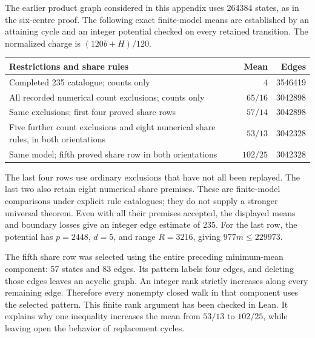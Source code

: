 \documentclass[11pt,a4paper]{article}
\theoremstyle{definition}
\theoremstyle{remark}
\begin{document}
The earlier product graph considered in this appendix uses 264384 states, as in the six-centre proof. The following exact finite-model means are established by an attaining cycle and an integer potential checked on every retained transition. The normalized charge is $(120b+H)/120$.
\begin{center}
\begin{tabular}{p{}rr}
\toprule
Restrictions and share rules & Mean & Edges\\\midrule
Completed 235 catalogue; counts only & $4$ & 3546419\\
All recorded numerical count exclusions; counts only & $65/16$ & 3042898\\
Same exclusions; first four proved share rows & $57/14$ & 3042898\\
Five further count exclusions and eight numerical share rules, in both orientations & $53/13$ & 3042328\\
Same model; fifth proved share row in both orientations & $102/25$ & 3042328\\
\bottomrule
\end{tabular}
\end{center}
The last four rows use ordinary exclusions that have not all been replayed. The last two also retain eight numerical share premises. These are finite-model comparisons under explicit rule catalogues; they do not supply a stronger universal theorem. Even with all their premises accepted, the displayed means and boundary losses give an integer edge estimate of 235. For the last row, the potential has $p=2448$, $d=5$, and range $R=3216$, giving $977m\le229973$.

The fifth share row was selected using the entire preceding minimum-mean component: 57 states and 83 edges. Its pattern labels four edges, and deleting those edges leaves an acyclic graph. An integer rank strictly increases along every remaining edge. Therefore every nonempty closed walk in that component uses the selected pattern. This finite rank argument has been checked in Lean. It explains why one inequality increases the mean from $53/13$ to $102/25$, while leaving open the behavior of replacement cycles.
\end{document}
